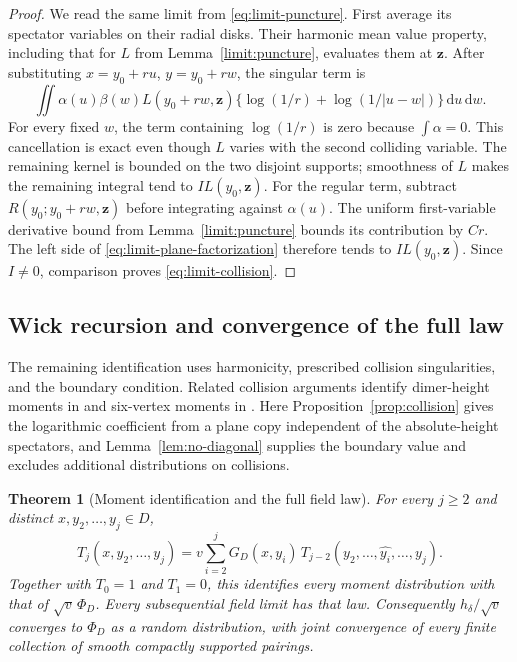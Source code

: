 \documentclass[11pt]{article}
\newcommand{\dd}{\,\mathrm d}
\newtheorem{theorem}{Theorem}[section]
\theoremstyle{definition}
\theoremstyle{remark}
\numberwithin{equation}{section}
\begin{document}
\begin{proof}
We read the same limit from \eqref{eq:limit-puncture}.
First average its spectator variables on their radial disks.
Their harmonic mean value property, including that for \(L\)
from Lemma~\ref{limit:puncture}, evaluates them at \(\mathbf z\).
After substituting \(x=y_0+ru\), \(y=y_0+rw\), the singular term is
\[
 \iint\alpha(u)\beta(w)L(y_0+rw,\mathbf z)
       \{\log(1/r)+\log(1/|u-w|)\}\dd u\dd w .
\]
For every fixed \(w\), the term containing \(\log(1/r)\) is zero
because \(\int\alpha=0\).  This cancellation is exact even though
\(L\) varies with the second colliding variable.
The remaining kernel is bounded on the two disjoint supports;
smoothness of \(L\) makes the remaining integral tend to
\(I L(y_0,\mathbf z)\).
For the regular term, subtract
\(R(y_0;y_0+rw,\mathbf z)\) before integrating against \(\alpha(u)\).
The uniform first-variable derivative bound from
Lemma~\ref{limit:puncture} bounds its contribution by \(Cr\).
The left side of \eqref{eq:limit-plane-factorization} therefore
tends to \(I L(y_0,\mathbf z)\).
Since \(I\ne0\), comparison proves \eqref{eq:limit-collision}.
\end{proof}

\subsection{Wick recursion and convergence of the full law}

The remaining identification uses harmonicity, prescribed collision
singularities, and the boundary condition.  Related collision arguments
identify dimer-height moments in \cite[Section~3]{Kenyon2001} and
six-vertex moments in \cite[Section~7.2]{DCKLM2026}.
Here Proposition~\ref{prop:collision} gives the logarithmic coefficient
from a plane copy independent of the absolute-height spectators, and
Lemma~\ref{lem:no-diagonal} supplies the boundary value and excludes
additional distributions on collisions.

\begin{theorem}[Moment identification and the full field law]
\label{thm:wick}
For every \(j\ge2\) and distinct \(x,y_2,\ldots,y_j\in D\),
\begin{equation}
 T_j(x,y_2,\ldots,y_j)
   =v\sum_{i=2}^j G_D(x,y_i)\,
          T_{j-2}(y_2,\ldots,\widehat{y_i},\ldots,y_j).
 \label{eq:limit-wick}
\end{equation}
Together with \(T_0=1\) and \(T_1=0\), this identifies every moment
distribution with that of \(\sqrt v\,\Phi_D\).
Every subsequential field limit has that law.  Consequently
\(h_\delta/\sqrt v\) converges to \(\Phi_D\) as a random
distribution, with joint convergence of every finite collection of
smooth compactly supported pairings.
\end{theorem}
\end{document}
